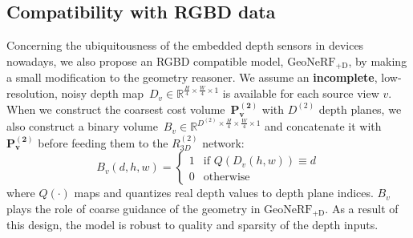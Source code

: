 \subsection{Compatibility with RGBD data} \label{sec:c3_rgbd_method}
Concerning the ubiquitousness of the embedded depth sensors in devices nowadays, we also propose an RGBD compatible model, $\text{GeoNeRF}_{\text{+D}}$, by making a small modification to the geometry reasoner. We assume an \textbf{incomplete}, low-resolution, noisy depth map~$D_{v} \in \mathbb{R}^{\frac{H}{4} \times \frac{W}{4} \times 1}$ is available for each source view $v$. When we construct the coarsest cost volume~$\boldsymbol{P^{(2)}_{v}}$ with $D^{(2)}$ depth planes, we also construct a binary volume~$B_{v} \in \mathbb{R}^{D^{(2)} \times \frac{H}{4} \times \frac{W}{4} \times 1}$ and concatenate it with $\boldsymbol{P^{(2)}_{v}}$ before feeding them to the $R^{(2)}_{3D}$ network:
\begin{equation}
    B_{v}(d,h,w) = \begin{cases} 
    1 &\mbox{if } Q \left( D_{v} \left(h,w \right) \right) \equiv d \\
    0 & \mbox{otherwise} 
    \end{cases}
\end{equation}
where $Q(\cdot)$ maps and quantizes real depth values to depth plane indices. $B_{v}$ plays the role of coarse guidance of the geometry in $\text{GeoNeRF}_{\text{+D}}$. As a result of this design, the model is robust to quality and sparsity of the depth inputs.


